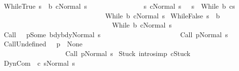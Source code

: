 \begin{isabellebody}
\isanewline
\isanewline
{\isacharbar}\ WhileTrue{\isacharcolon}\ {\isachardoublequoteopen}{\isasymlbrakk}s\ {\isasymin}\ b{\isacharsemicolon}\ {\isasymGamma}{\isasymturnstile}c{\isasymdown}{\isacharparenleft}Normal\ s{\isacharparenright}{\isacharsemicolon}\ \isanewline
\ \ \ \ \ \ \ \ \ \ \ \ \ \ \ {\isasymforall}s{\isacharprime}{\isachardot}\ {\isasymGamma}{\isasymturnstile}{\isasymlangle}c{\isacharcomma}Normal\ s\ {\isasymrangle}\ {\isasymRightarrow}\ s{\isacharprime}\ {\isasymlongrightarrow}\ {\isasymGamma}{\isasymturnstile}While\ b\ c{\isasymdown}s{\isacharprime}{\isasymrbrakk}\ \isanewline
\ \ \ \ \ \ \ \ \ \ \ \ \ \ {\isasymLongrightarrow}\ \ \isanewline
\ \ \ \ \ \ \ \ \ \ \ \ \ \ {\isasymGamma}{\isasymturnstile}While\ b\ c{\isasymdown}{\isacharparenleft}Normal\ s{\isacharparenright}{\isachardoublequoteclose}\isanewline
\isanewline
{\isacharbar}\ WhileFalse{\isacharcolon}\ {\isachardoublequoteopen}{\isasymlbrakk}s\ {\isasymnotin}\ b{\isasymrbrakk}\ \isanewline
\ \ \ \ \ \ \ \ \ \ \ \ \ \ \ {\isasymLongrightarrow}\ \ \isanewline
\ \ \ \ \ \ \ \ \ \ \ \ \ \ \ {\isasymGamma}{\isasymturnstile}While\ b\ c{\isasymdown}{\isacharparenleft}Normal\ s{\isacharparenright}{\isachardoublequoteclose}\isanewline
\isanewline
{\isacharbar}\ Call{\isacharcolon}\ \ {\isachardoublequoteopen}{\isasymlbrakk}{\isasymGamma}\ p{\isacharequal}Some\ bdy{\isacharsemicolon}{\isasymGamma}{\isasymturnstile}bdy{\isasymdown}{\isacharparenleft}Normal\ s{\isacharparenright}{\isasymrbrakk}\ \isanewline
\ \ \ \ \ \ \ \ \ \ {\isasymLongrightarrow}\ \isanewline
\ \ \ \ \ \ \ \ \ \ {\isasymGamma}{\isasymturnstile}Call\ p{\isasymdown}{\isacharparenleft}Normal\ s{\isacharparenright}{\isachardoublequoteclose}\isanewline
\isanewline
{\isacharbar}\ CallUndefined{\isacharcolon}\ \ {\isachardoublequoteopen}{\isasymlbrakk}{\isasymGamma}\ p\ {\isacharequal}\ None{\isasymrbrakk}\ \isanewline
\ \ \ \ \ \ \ \ \ \ \ \ \ \ \ \ \ \ \ {\isasymLongrightarrow}\ \isanewline
\ \ \ \ \ \ \ \ \ \ \ \ \ \ \ \ \ \ \ {\isasymGamma}{\isasymturnstile}Call\ p{\isasymdown}{\isacharparenleft}Normal\ s{\isacharparenright}{\isachardoublequoteclose}\isanewline
\isanewline
{\isacharbar}\ Stuck\ {\isacharbrackleft}intro{\isacharcomma}simp{\isacharbrackright}{\isacharcolon}\ {\isachardoublequoteopen}{\isasymGamma}{\isasymturnstile}c{\isasymdown}Stuck{\isachardoublequoteclose}\isanewline
\ \isanewline
{\isacharbar}\ DynCom{\isacharcolon}\ \ {\isachardoublequoteopen}{\isasymlbrakk}{\isasymGamma}{\isasymturnstile}{\isacharparenleft}c\ s{\isacharparenright}{\isasymdown}{\isacharparenleft}Normal\ s{\isacharparenright}{\isasymrbrakk}\ \isanewline

\end{isabellebody}
